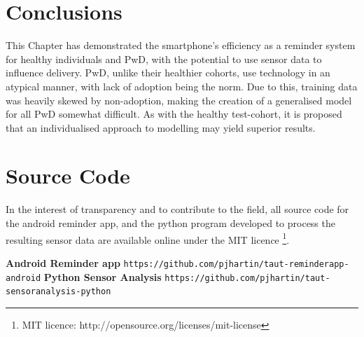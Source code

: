 \section{Conclusions}
This Chapter has demonstrated the smartphone's efficiency as a reminder system for healthy individuals and PwD, with the potential to use sensor data to influence delivery. PwD, unlike their healthier cohorts, use technology in an atypical manner, with lack of adoption being the norm. Due to this, training data was heavily skewed by non-adoption, making the creation of a generalised model for all PwD somewhat difficult. As with the healthy test-cohort, it is proposed that an individualised approach to modelling may yield superior results.

\section{Source Code}
In the interest of transparency and to contribute to the field, all source code for the android reminder app, and the python program developed to process the resulting sensor data are available online under the MIT licence \footnote{MIT licence: http://opensource.org/licenses/mit-license}.

\textbf{Android Reminder app} \newline \texttt{https://github.com/pjhartin/taut-reminderapp-android}
\newline \textbf{Python Sensor Analysis} \newline \texttt{https://github.com/pjhartin/taut-sensoranalysis-python}